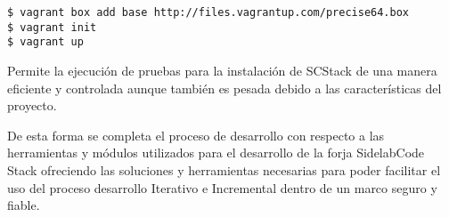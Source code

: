 \lstset{style=bashbasico}
\begin{lstlisting}[frame=trbl]
$ vagrant box add base http://files.vagrantup.com/precise64.box
$ vagrant init
$ vagrant up
\end{lstlisting}

\par Permite la ejecución de pruebas para la instalación de SCStack de una manera eficiente y controlada aunque también es pesada debido a las características del proyecto.

\par De esta forma se completa el proceso de desarrollo con respecto a las herramientas y módulos utilizados para el desarrollo de la forja SidelabCode Stack ofreciendo las soluciones y herramientas necesarias para poder facilitar el uso del proceso desarrollo Iterativo e Incremental dentro de un marco seguro y fiable.



